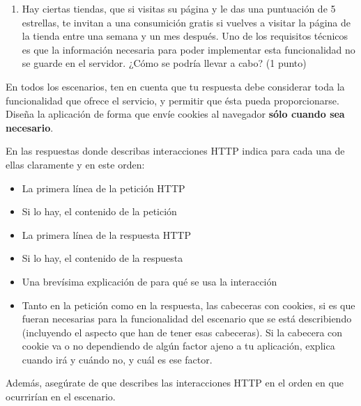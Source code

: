 \begin{enumerate}
    \item Hay ciertas tiendas, que si visitas su página y le das una puntuación de 5 estrellas, te invitan a una consumición gratis si vuelves a visitar la página de la tienda entre una semana y un mes después. Uno de los requisitos técnicos es que la información necesaria para poder implementar esta funcionalidad no se guarde en el servidor. ¿Cómo se podría llevar a cabo? (1 punto)

\end{enumerate}

En todos los escenarios, ten en cuenta que tu respuesta debe considerar toda la funcionalidad que ofrece el servicio, y permitir que ésta pueda proporcionarse. Diseña la aplicación de forma que envíe cookies al navegador {\bf sólo cuando sea necesario}.

En las respuestas donde describas interacciones HTTP indica para cada una de ellas claramente y en este orden:
    \begin{itemize}
    \item La primera línea de la petición HTTP
    \item Si lo hay, el contenido de la petición
    \item La primera línea de la respuesta HTTP
    \item Si lo hay, el contenido de la respuesta
    \item Una brevísima explicación de para qué se usa la interacción
    \item Tanto en la petición como en la respuesta, las cabeceras con cookies, si es que fueran necesarias para la funcionalidad del escenario que se está describiendo (incluyendo el aspecto que han de tener esas cabeceras). Si la cabecera con cookie va o no dependiendo de algún factor ajeno a tu aplicación, explica cuando irá y cuándo no, y cuál es ese factor.
    \end{itemize}

Además, asegúrate de que describes las interacciones HTTP en el orden en que ocurrirían en el escenario.

